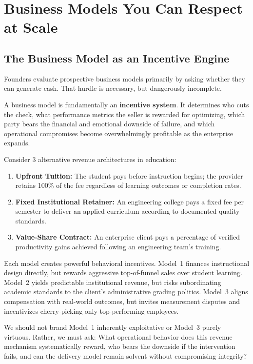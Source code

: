 \section{Business Models You Can Respect at Scale}

\subsection{The Business Model as an Incentive Engine}

Founders evaluate prospective business models primarily by asking whether they can generate cash. That hurdle is necessary, but dangerously incomplete.

A business model is fundamentally an \textbf{incentive system}. It determines who cuts the check, what performance metrics the seller is rewarded for optimizing, which party bears the financial and emotional downside of failure, and which operational compromises become overwhelmingly profitable as the enterprise expands.

Consider 3 alternative revenue architectures in education:

\begin{enumerate}[leftmargin=12pt,itemsep=2pt,topsep=1pt,parsep=0pt]
  \item \textbf{Upfront Tuition:} The student pays before instruction begins; the provider retains 100\% of the fee regardless of learning outcomes or completion rates.
  \item \textbf{Fixed Institutional Retainer:} An engineering college pays a fixed fee per semester to deliver an applied curriculum according to documented quality standards.
  \item \textbf{Value-Share Contract:} An enterprise client pays a percentage of verified productivity gains achieved following an engineering team's training.
\end{enumerate}

Each model creates powerful behavioral incentives. Model~1 finances instructional design directly, but rewards aggressive top-of-funnel sales over student learning. Model~2 yields predictable institutional revenue, but risks subordinating academic standards to the client's administrative grading politics. Model~3 aligns compensation with real-world outcomes, but invites measurement disputes and incentivizes cherry-picking only top-performing employees.

We should not brand Model~1 inherently exploitative or Model~3 purely virtuous. Rather, we must ask: What operational behavior does this revenue mechanism systematically reward, who bears the downside if the intervention fails, and can the delivery model remain solvent without compromising integrity?

